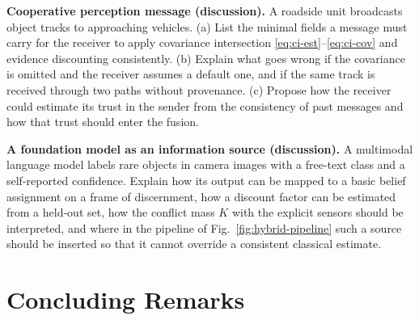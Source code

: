 \documentclass[graybox,envcountchap]{style/SNmono}
\begin{document}
\begin{prob}\label{prob:ch08:5}
\textbf{Cooperative perception message (discussion).} A roadside unit broadcasts object tracks to approaching vehicles. (a) List the minimal fields a message must carry for the receiver to apply covariance intersection \eqref{eq:ci-est}--\eqref{eq:ci-cov} and evidence discounting consistently. (b) Explain what goes wrong if the covariance is omitted and the receiver assumes a default one, and if the same track is received through two paths without provenance. (c) Propose how the receiver could estimate its trust in the sender from the consistency of past messages and how that trust should enter the fusion.
\end{prob}

\begin{prob}\label{prob:ch08:6}
\textbf{A foundation model as an information source (discussion).} A multimodal language model labels rare objects in camera images with a free-text class and a self-reported confidence. Explain how its output can be mapped to a basic belief assignment on a frame of discernment, how a discount factor can be estimated from a held-out set, how the conflict mass $K$ with the explicit sensors should be interpreted, and where in the pipeline of Fig.~\ref{fig:hybrid-pipeline} such a source should be inserted so that it cannot override a consistent classical estimate.
\end{prob}




\clearpage

\clearpage

\chapter{Concluding Remarks}
\label{sec:conclusions}






\suppressfloats[t]
\end{document}
